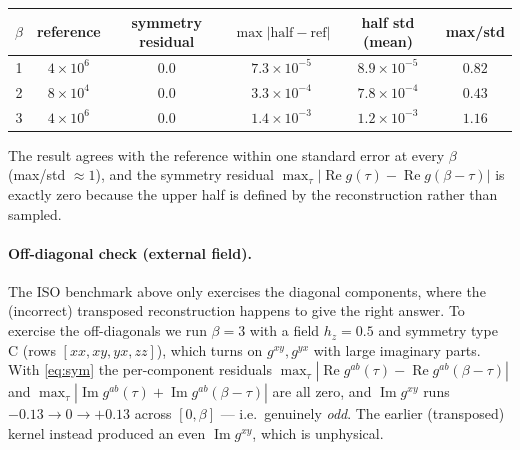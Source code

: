 \documentclass[11pt]{article}
\newcommand{\g}{g}
\newcommand{\bt}{\beta}
\begin{document}
\begin{center}
\begin{tabular}{cccccc}
\toprule
$\bt$ & reference & symmetry residual & $\max|\text{half}-\text{ref}|$ & half std (mean) & max/std \\
\midrule
1 & $4\times10^{6}$ & $0.0$ & $7.3\times10^{-5}$ & $8.9\times10^{-5}$ & $0.82$ \\
2 & $8\times10^{4}$ & $0.0$ & $3.3\times10^{-4}$ & $7.8\times10^{-4}$ & $0.43$ \\
3 & $4\times10^{6}$ & $0.0$ & $1.4\times10^{-3}$ & $1.2\times10^{-3}$ & $1.16$ \\
\bottomrule
\end{tabular}
\end{center}

The result agrees with the reference within one standard error at every $\bt$
(max/std $\approx 1$), and the symmetry residual
$\max_\tau|\operatorname{Re}\g(\tau)-\operatorname{Re}\g(\bt-\tau)|$ is exactly zero
because the upper half is defined by the reconstruction rather than sampled.

\paragraph{Off-diagonal check (external field).} The ISO benchmark above only exercises
the diagonal components, where the (incorrect) transposed reconstruction happens to give
the right answer. To exercise the off-diagonals we run $\bt=3$ with a field $h_z=0.5$ and
symmetry type C (rows $[xx,xy,yx,zz]$), which turns on $\g^{xy},\g^{yx}$ with large
imaginary parts. With \eqref{eq:sym} the per-component residuals
$\max_\tau|\operatorname{Re}\g^{ab}(\tau)-\operatorname{Re}\g^{ab}(\bt-\tau)|$ and
$\max_\tau|\operatorname{Im}\g^{ab}(\tau)+\operatorname{Im}\g^{ab}(\bt-\tau)|$ are all
zero, and $\operatorname{Im}\g^{xy}$ runs $-0.13 \to 0 \to +0.13$ across $[0,\bt]$ ---
i.e.\ genuinely \emph{odd}. The earlier (transposed) kernel instead produced an even
$\operatorname{Im}\g^{xy}$, which is unphysical.
\end{document}
